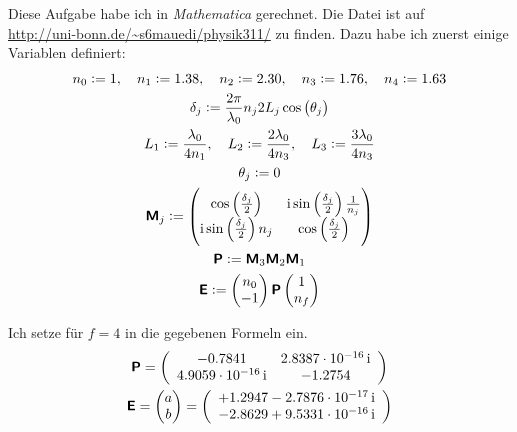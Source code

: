 Diese Aufgabe habe ich in \emph{Mathematica} gerechnet. Die Datei ist auf \\
\url{http://uni-bonn.de/~s6mauedi/physik311/} zu finden. Dazu habe ich zuerst
einige Variablen definiert:
\begin{gather*}
	n_0 := 1
	,\quad
	n_1 := 1.38
	,\quad
	n_2 := 2.30
	,\quad
	n_3 := 1.76
	,\quad
	n_4 := 1.63 \\
	\delta_j := \frac{2 \pi}{\lambda_0} n_j 2 L_j \cos\del{\theta_j} \\
	L_1 := \frac{\lambda_0}{4 n_1}
	,\quad
	L_2 := \frac{2 \lambda_0}{4 n_3}
	,\quad
	L_3 := \frac{3 \lambda_0}{4 n_3} \\
	\theta_j := 0 \\
	\tens M_j := \begin{pmatrix}
		\cos\del{\frac{\delta_j}{2}} &
		\ii \sin\del{\frac{\delta_j}{2}} \frac{1}{n_j} \\
		\ii \sin\del{\frac{\delta_j}{2}} n_j &
		\cos\del{\frac{\delta_j}{2}}
	\end{pmatrix} \\
	\tens P := \tens M_3 \tens M_2 \tens M_1 \\
	\tens E :=
	\begin{pmatrix}
		n_0 \\ -1
	\end{pmatrix}
	\tens P
	\begin{pmatrix}
		1 \\ n_f
	\end{pmatrix}
\end{gather*}

Ich setze für $f = 4$ in die gegebenen Formeln ein.
\begin{gather*}
	\tens P
	=
	\left(
\begin{array}{cc}
 -0.7841& 2.8387\e{-16} \, \ii \\
 4.9059\e{-16}  \,\ii & -1.2754 \\
\end{array}
\right) \\
%
	\tens E
	=
	\begin{pmatrix}
		a \\ b
	\end{pmatrix}
	=
	\left(
	\begin{array}{c}
		+1.2947 -2.7876\e{-17} \, \ii \\
		-2.8629 +9.5331\e{-16} \, \ii \\
	\end{array}
	\right)
\end{gather*}

